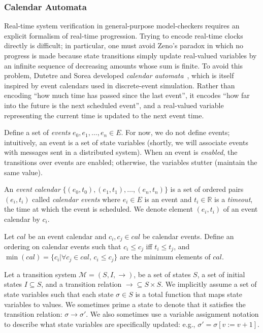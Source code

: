 



\subsubsection{Calendar Automata}\label{ssec:calendar}

Real-time system verification in general-purpose model-checkers
requires an explicit formalism of real-time progression. Trying to
encode real-time clocks directly is difficult; in particular, one
must avoid Zeno's paradox in which no progress is made because state
transitions simply update real-valued variables by an infinite
sequence of decreasing amounts whose sum is finite. To avoid this
problem, Dutetre and Sorea developed \emph{calendar
automata}~\cite{Dutertre-Sorea-2004}, which is itself inspired by
event calendars used in discrete-event simulation. Rather than
encoding ``how much time has passed since the last event'', it
encodes ``how far into the future is the next scheduled event'',
and a real-valued variable representing the current time is updated
to the next event time.

Define a set of \emph{events} $e_0, e_1, \ldots, e_n \in E$. For now, we
do not define events; intuitively, an event is a set of state variables
(shortly, we will associate events with messages sent in a distributed
system). When an event is \emph{enabled}, the transitions over events
are enabled; otherwise, the variables stutter (maintain the same value).

An \emph{event calendar} $\{ (e_0, t_0), (e_1, t_1), \ldots, (e_n, t_n)
\}$ is a set of ordered pairs $(e_i, t_i)$ called \emph{calendar events}
where $e_i \in E$ is an event and $t_i \in \mathbb{R}$ is a
\emph{timeout}, the time at which the event is scheduled. We denote
element $(e_i, t_i)$ of an event calendar by $c_i$.

Let $cal$ be an event calendar and $c_i, c_j \in cal$ be calendar
events. Define an ordering on calendar events such that $c_i \leq c_j$
iff $t_i \leq t_j$, and $\min(cal) = \{ c_i | \forall c_j \in cal, \,
c_i \leq c_j  \}$ are the minimum elements of $cal$.

Let a transition system $\mathcal{M} = (S, I, \rightarrow)$, be a set of
states $S$, a set of initial states $I \subseteq S$, and a transition
relation $\rightarrow \subseteq S \times S$. We implicitly assume a set
of state variables such that each state $\sigma \in S$ is a total
function that maps state variables to values. We sometimes prime a state
to denote that it satisfies the transition relation: $\sigma \rightarrow
\sigma'$. We also sometimes use a variable assignment notation to
describe what state variables are specifically updated: e.g., $\sigma' =
\sigma[v := v+1]$.

